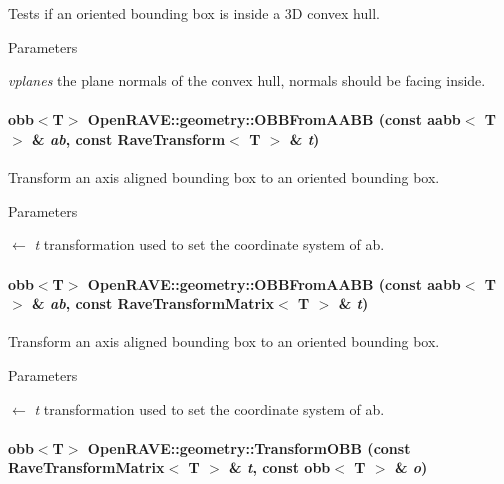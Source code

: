 Tests if an oriented bounding box is inside a 3D convex hull. 


\begin{DoxyParams}{Parameters}
\item[{\em vplanes}]the plane normals of the convex hull, normals should be facing inside. \end{DoxyParams}
\hypertarget{group__geometric__primitives_ga645564c4c561b14b14b90d6d02c0e766}{
\paragraph[{OBBFromAABB}]{\setlength{\rightskip}{0pt plus 5cm}obb$<$T$>$ OpenRAVE::geometry::OBBFromAABB (const aabb$<$ T $>$ \& {\em ab}, \/  const RaveTransform$<$ T $>$ \& {\em t})}\hfill}
\label{group__geometric__primitives_ga645564c4c561b14b14b90d6d02c0e766}


Transform an axis aligned bounding box to an oriented bounding box. 


\begin{DoxyParams}{Parameters}
\item[\mbox{$\leftarrow$} {\em t}]transformation used to set the coordinate system of ab. \end{DoxyParams}
\hypertarget{group__geometric__primitives_ga1aaf2360c518e6a9106315a87aaec95d}{
\paragraph[{OBBFromAABB}]{\setlength{\rightskip}{0pt plus 5cm}obb$<$T$>$ OpenRAVE::geometry::OBBFromAABB (const aabb$<$ T $>$ \& {\em ab}, \/  const RaveTransformMatrix$<$ T $>$ \& {\em t})}\hfill}
\label{group__geometric__primitives_ga1aaf2360c518e6a9106315a87aaec95d}


Transform an axis aligned bounding box to an oriented bounding box. 


\begin{DoxyParams}{Parameters}
\item[\mbox{$\leftarrow$} {\em t}]transformation used to set the coordinate system of ab. \end{DoxyParams}
\hypertarget{group__geometric__primitives_ga588d811884a84cddef8910f749dc5aee}{
\paragraph[{TransformOBB}]{\setlength{\rightskip}{0pt plus 5cm}obb$<$T$>$ OpenRAVE::geometry::TransformOBB (const RaveTransformMatrix$<$ T $>$ \& {\em t}, \/  const obb$<$ T $>$ \& {\em o})}\hfill}
\label{group__geometric__primitives_ga588d811884a84cddef8910f749dc5aee}


